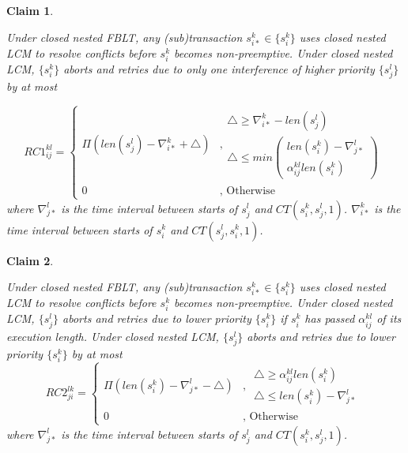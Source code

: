 \documentclass[letter]{sig-alternate}
\newtheorem{clm}{Claim}
\begin{document}
\begin{clm}\label{clm:closed_nested_lcm_before_alpha_two_tx}

Under closed nested FBLT, any (sub)transaction $s_{i*}^{k}\in\{s_{i}^{k}\}$
uses closed nested LCM to resolve conflicts before $s_{i}^{k}$ becomes
non-preemptive. Under closed nested LCM, $\{s_{i}^{k}\}$ aborts and
retries due to only one interference of higher priority $\{s_{j}^{l}\}$
by at most 

\begin{equation}
RC1_{ij}^{kl}=\begin{cases}
\Pi\left(len\left(s_{j}^{l}\right)-\nabla_{i*}^{k}+\triangle\right) & \mbox{,}\begin{gathered}\triangle\ge\nabla_{i*}^{k}-len\left(s_{j}^{l}\right)\\
\triangle\le min\left(\begin{gathered}len\left(s_{i}^{k}\right)-\nabla_{j*}^{l}\\
\alpha_{ij}^{kl}len\left(s_{i}^{k}\right)
\end{gathered}
\right)
\end{gathered}
\\
0 & \mbox{, Otherwise}
\end{cases}\label{eq:closed_nested_lcm_before_alpha_two_tx}
\end{equation}
where $\nabla_{j*}^{l}$ is the time interval between starts of $s_{j}^{l}$
and $CT(s_{i}^{k},s_{j}^{l},1)$. $\nabla_{i*}^{k}$ is the time interval
between starts of $s_{i}^{k}$ and $CT(s_{j}^{l},s_{i}^{k},1)$.

\end{clm}

\begin{clm}\label{clm:closed_nested_lcm_after_alpha}

Under closed nested FBLT, any (sub)transaction $s_{i*}^{k}\in\{s_{i}^{k}\}$
uses closed nested LCM to resolve conflicts before $s_{i}^{k}$ becomes
non-preemptive. Under closed nested LCM, $\{s_{j}^{l}\}$ aborts and
retries due to lower priority $\{s_{i}^{k}\}$ if $s_{i}^{k}$ has
passed $\alpha_{ij}^{kl}$ of its execution length. Under closed nested
LCM, $\{s_{j}^{l}\}$ aborts and retries due to lower priority $\{s_{i}^{k}\}$
by at most 
\begin{equation}
RC2_{ji}^{lk}=\begin{cases}
\Pi\left(len\left(s_{i}^{k}\right)-\nabla_{j*}^{l}-\triangle\right) & ,\,\begin{gathered}\triangle\ge\alpha_{ij}^{kl}len\left(s_{i}^{k}\right)\\
\triangle\le len\left(s_{i}^{k}\right)-\nabla_{j*}^{l}
\end{gathered}
\\
0 & ,\mbox{ Otherwise}
\end{cases}\label{eq:closed_nested_lcm_after_alpha_two_tx}
\end{equation}
 where $\nabla_{j*}^{l}$ is the time interval between starts of $s_{j}^{l}$
and $CT(s_{i}^{k},s_{j}^{l},1)$.

\end{clm}
\end{document}
